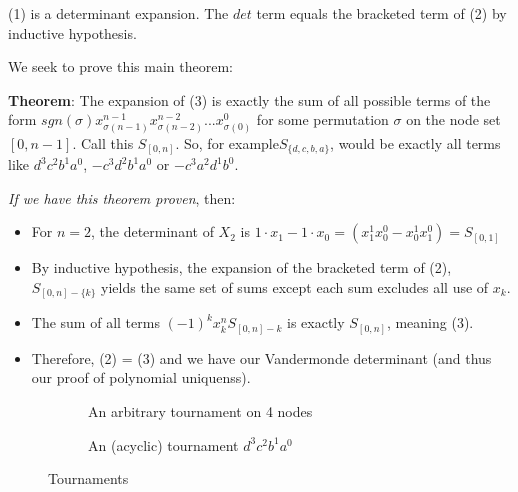 \documentclass[11pt, oneside]{article} 	%
\begin{document}
(1) is a determinant expansion.  The $det$ term equals the bracketed term of (2) by inductive hypothesis.



We seek to prove this main theorem:

\textbf{Theorem}: The expansion of (3) is exactly the sum of all possible terms of the form $sgn(\sigma) x_{\sigma(n-1)}^{n-1} x_{\sigma(n-2)}^{n-2} ... x_{\sigma(0)}^{0} $ for some permutation $\sigma$ on the node set $[0, n-1]$.  Call this $S_{[0,n]}$.  So, for example$S_{\{d,c,b,a\}}$, would be exactly all terms like $d^3c^2b^1a^0$, $-c^3d^2b^1a^0$ or $-c^3a^2d^1b^0$.

\emph{If we have this theorem proven}, then:

\begin{itemize}
\item For $n=2$, the determinant of $X_2$ is $1\cdot x_1 - 1 \cdot x_0 = (x_1^1x_0^0 - x_0^1x_1^0) = S_{[0,1]}$
\item By inductive hypothesis, the expansion of the bracketed term of (2), $S_{[0,n]-\{k\}}$ yields the same set of sums except each sum excludes all use of $x_k$.
\item The sum of all terms $(-1)^kx_k^nS_{[0,n]-{k}}$ is exactly $S_{[0,n]}$, meaning (3).
\item Therefore, (2) = (3) and we have our Vandermonde determinant (and thus  our proof of polynomial uniquenss).
\end{itemize}




\begin{figure}
\centering
\begin{subfigure}{.5\textwidth}
  \centering

  \caption{An arbitrary tournament on 4 nodes}
  \label{fig:sub1}
\end{subfigure}
\begin{subfigure}{.5\textwidth}
  \centering
  \caption{An (acyclic) tournament $d^3c^2b^1a^0$}
  \label{fig:sub2}
\end{subfigure}
\caption{Tournaments}
\label{fig:test}
\end{figure}
\end{document}
